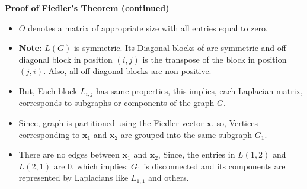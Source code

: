 \documentclass[aspectratio=169]{beamer}
\begin{document}
\begin{frame}{\textbf{Proof of Fiedler's Theorem (continued)}}

\begin{itemize}
  \item \( O \) denotes a matrix of appropriate size with all entries equal to zero.
  
  \item \textbf{Note: }\( L(G) \) is symmetric. Its Diagonal blocks of are symmetric and  off-diagonal block in position \( (i, j) \) is the transpose of the block in position \( (j, i) \). Also, all off-diagonal blocks are non-positive.


  \item But, Each block \( L_{i,j} \) has same properties, this implies, each Laplacian matrix, corresponds to subgraphs or components of the graph \( G \).

  \item Since, graph is partitioned using the Fiedler vector \( \mathbf{x} \). so, Vertices corresponding to \( \mathbf{x}_1 \) and \( \mathbf{x}_2 \) are grouped into the same subgraph \( G_1 \).

  \item There are no edges between \( \mathbf{x}_1 \) and \( \mathbf{x}_2 \), Since, the entries in \( L(1, 2) \) and \( L(2, 1) \) are 0. which implies: \( G_1 \) is disconnected and its components are represented by Laplacians like \( L_{1,1} \) and others.

\end{itemize}
\end{frame}

\end{document}
